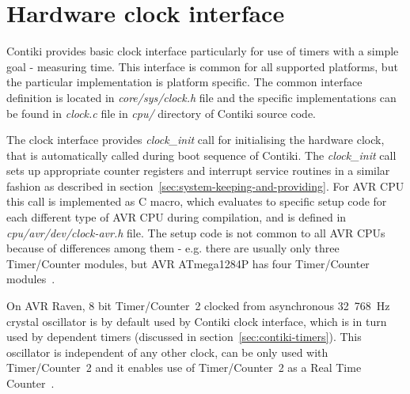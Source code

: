 
\section{Hardware clock interface}
Contiki provides basic clock interface particularly for use of timers
with a simple goal - measuring time.
This interface is common for all supported platforms,
but the particular implementation is platform specific.
The common interface definition is located in {\it{core/sys/clock.h}} file
and the specific implementations can be found in {\it{clock.c}} file
in {\it{cpu/}} directory of Contiki source code.

The clock interface provides {\it{clock\_init}} call for initialising the hardware clock,
that is automatically called during boot sequence of Contiki.
The {\it{clock\_init}} call sets up
appropriate counter registers and interrupt service routines in a similar fashion
as described in section~\ref{sec:system-keeping-and-providing}.
For AVR CPU this call is implemented as C macro, which evaluates to specific setup code for each
different type of AVR CPU during compilation, and is defined in {\it{cpu/avr/dev/clock-avr.h}} file.
The setup code is not common to all AVR CPUs because of differences among them - e.g. there are usually
only three Timer/Counter modules, but AVR ATmega1284P has four Timer/Counter modules~\cite{avr-datasheet}.

On AVR Raven, 8 bit Timer/Counter~2 clocked from asynchronous 32~768~Hz crystal oscillator
is by default used by Contiki clock interface,
which is in turn used by dependent timers (discussed in section~\ref{sec:contiki-timers}).
This oscillator is independent of any other clock,
can be only used with Timer/Counter~2 and it
enables use of Timer/Counter~2 as a Real Time Counter~\cite{avr-datasheet}.


